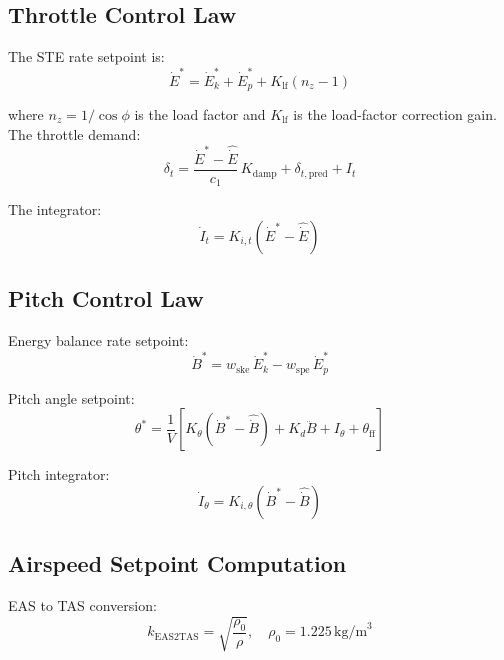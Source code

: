 \documentclass[12pt,a4paper]{report}
\begin{document}
\subsection{Throttle Control Law}

The STE rate setpoint is:
\begin{equation}
  \dot{E}^* = \dot{E}_k^* + \dot{E}_p^*
            + K_{\text{lf}}(n_z - 1)
\end{equation}

where $n_z = 1/\cos\phi$ is the load factor and $K_{\text{lf}}$ is the
load-factor correction gain. The throttle demand:
\begin{equation}
  \delta_t = \frac{\dot{E}^* - \hat{\dot{E}}}{c_1}\,K_{\text{damp}}
           + \delta_{t,\text{pred}} + I_t
\end{equation}

The integrator:
\begin{equation}
  \dot{I}_t = K_{i,t}(\dot{E}^* - \hat{\dot{E}})
\end{equation}

\subsection{Pitch Control Law}

Energy balance rate setpoint:
\begin{equation}
  \dot{B}^* = w_{\text{ske}}\,\dot{E}_k^* - w_{\text{spe}}\,\dot{E}_p^*
\end{equation}

Pitch angle setpoint:
\begin{equation}
  \theta^* = \frac{1}{V}\!\left[
    K_\theta(\dot{B}^* - \hat{\dot{B}}) + K_d\ddot{B} + I_\theta + \theta_{\text{ff}}
  \right]
\end{equation}

Pitch integrator:
\begin{equation}
  \dot{I}_\theta = K_{i,\theta}(\dot{B}^* - \hat{\dot{B}})
\end{equation}

\subsection{Airspeed Setpoint Computation}

EAS to TAS conversion:
\begin{equation}
  k_{\text{EAS2TAS}} = \sqrt{\frac{\rho_0}{\rho}}, \quad \rho_0 = 1.225\,\text{kg/m}^3
\end{equation}
\end{document}
